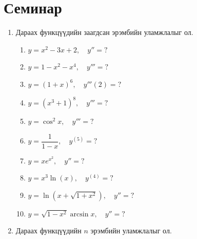 \section{Семинар}
\begin{enumerate}
    \item Дараах функцүүдийн заагдсан эрэмбийн уламжлалыг ол.
\begin{enumerate}
  \item $y = x^2 - 3x + 2,\quad y'' = ?$
  \item $y=1-x^2-x^4, \quad y'''=?$
  \item $y=(1+x)^6, \quad y'''(2)=?$
  \item $y=(x^3+1)^8, \quad y'''=?$
  \item $y=\cos ^2 x, \quad y'''=?$
  \item $y=\dfrac{1}{1-x}, \quad y^{(5)}=?$
  \item $y = xe^{x^2},\quad y'' = ?$
  \item $y = x^3\ln(x),\quad y^{(4)} = ?$
  \item $y = \ln(x+\sqrt{1+x^2}),\quad y'' = ?$
  \item $y = \sqrt{1-x^2}\arcsin x,\quad y'' = ?$
\end{enumerate}
\item Дараах функцүүдийн $n$ эрэмбийн уламжлалыг ол.
\begin{enumerate}
   

\end{enumerate}
\end{enumerate}
